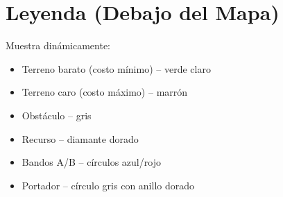 \section{Leyenda (Debajo del Mapa)}
\label{sec:gui-leyenda}

Muestra dinámicamente:
\begin{itemize}
\item Terreno barato (costo mínimo) -- verde claro
\item Terreno caro (costo máximo) -- marrón
\item Obstáculo -- gris
\item Recurso -- diamante dorado
\item Bandos A/B -- círculos azul/rojo
\item Portador -- círculo gris con anillo dorado
\end{itemize}
